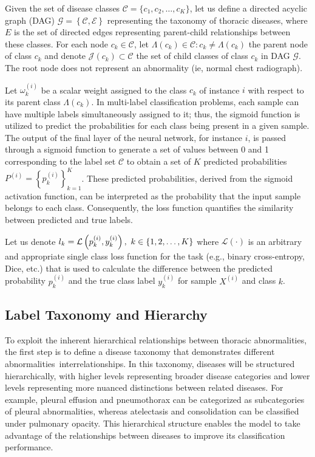 \documentclass[preprint,3p,times, review]{elsarticle}
\begin{document}
Given the set of disease classes $\mathcal{C} = \{c_1,c_2,\dots,c_K\} $, let us define a directed acyclic graph (DAG) $\mathcal{G}=\left\{\mathcal{C},\mathcal{E}\right\} $ representing the taxonomy of thoracic diseases, where $E $ is the set of directed edges representing parent-child relationships between these classes. For each node $c_k \in \mathcal{C} $, let $\Lambda (c_k) \in \mathcal{C} : c_k \neq \Lambda(c_k) $ the parent node of class $c_k $ and denote $\mathcal{J} (c_k)\subset \mathcal{C} $ the set of child classes of class $c_k $ in DAG $\mathcal{G} $. The root node does not represent an abnormality (ie, normal chest radiograph).

Let $\omega_k^{(i)} $ be a scalar weight assigned to the class $c_k $ of instance $i $ with respect to its parent class $\Lambda(c_k) $. In multi-label classification problems, each sample can have multiple labels simultaneously assigned to it; thus, the sigmoid function is utilized to predict the probabilities for each class being present in a given sample. The output of the final layer of the neural network, for instance $i $, is passed through a sigmoid function to generate a set of values between 0 and 1 corresponding to the label set $\mathcal{C} $ to obtain a set of $K $ predicted probabilities $P^{(i)}={\left\{p_k^{(i)}\right\}}_{k=1}^{K} $. These predicted probabilities, derived from the sigmoid activation function, can be interpreted as the probability that the input sample belongs to each class. Consequently, the loss function quantifies the similarity between predicted and true labels.

Let us denote $l_k = \mathcal{L} \left(p_k^{(i)},y_k^{(i)}\right),\hspace{0.33em}k \in \{1,2,\dots,K\} $ where $\mathcal{L}(\cdot) $ is an arbitrary and appropriate single class loss function for the task (e.g., binary cross-entropy, Dice, etc.) that is used to calculate the difference between the predicted probability $p_k^{(i)} $ and the true class label $y_k^{(i)} $ for sample $X^{(i)} $ and class $k $.



\subsection{Label Taxonomy and Hierarchy}
To exploit the inherent hierarchical relationships between thoracic abnormalities, the first step is to define a disease taxonomy that demonstrates different abnormalities~interrelationships. In this taxonomy, diseases will be structured hierarchically, with higher levels representing broader disease categories and lower levels representing more nuanced distinctions between related diseases. For example, pleural effusion and pneumothorax can be categorized as subcategories of pleural abnormalities, whereas atelectasis and consolidation can be classified under pulmonary opacity. This hierarchical structure enables the model to take advantage of the relationships between diseases to improve its classification performance.
\end{document}
